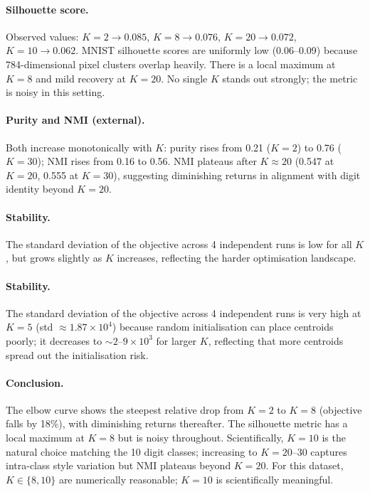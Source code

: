 \documentclass[11pt]{article}
\begin{document}
\paragraph{Silhouette score.}
Observed values: $K{=}2\to0.085$, $K{=}8\to0.076$, $K{=}20\to0.072$,
$K{=}10\to0.062$.
MNIST silhouette scores are uniformly low (0.06--0.09) because
784-dimensional pixel clusters overlap heavily.
There is a local maximum at $K{=}8$ and mild recovery at $K{=}20$.
No single $K$ stands out strongly; the metric is noisy in this setting.

\paragraph{Purity and NMI (external).}
Both increase monotonically with $K$: purity rises from 0.21 ($K{=}2$)
to 0.76 ($K{=}30$); NMI rises from 0.16 to 0.56.
NMI plateaus after $K{\approx}20$ (0.547 at $K{=}20$, 0.555 at $K{=}30$),
suggesting diminishing returns in alignment with digit identity beyond $K{=}20$.

\paragraph{Stability.}
The standard deviation of the objective across 4 independent runs is low for
all $K$, but grows slightly as $K$ increases, reflecting the harder
optimisation landscape.

\paragraph{Stability.}
The standard deviation of the objective across 4 independent runs is very high
at $K{=}5$ (std $\approx 1.87\times10^4$) because random initialisation can
place centroids poorly; it decreases to $\sim 2$--$9\times10^3$ for larger $K$,
reflecting that more centroids spread out the initialisation risk.

\paragraph{Conclusion.}
The elbow curve shows the steepest relative drop from $K{=}2$ to $K{=}8$
(objective falls by 18\%), with diminishing returns thereafter.
The silhouette metric has a local maximum at $K{=}8$ but is noisy throughout.
Scientifically, $K{=}10$ is the natural choice matching the 10 digit classes;
increasing to $K{=}20$--$30$ captures intra-class style variation but NMI
plateaus beyond $K{=}20$.
For this dataset, $K \in \{8,10\}$ are numerically reasonable;
$K{=}10$ is scientifically meaningful.
\end{document}
